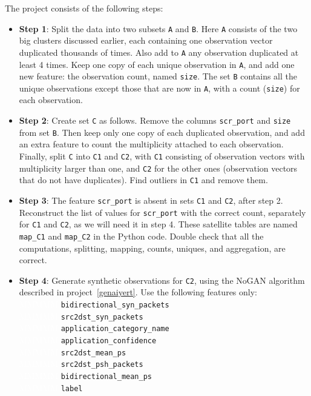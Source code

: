 \documentclass[oneside,10pt]{book}
\begin{document}
\noindent The project consists of the following steps: \vspace{1ex}
\begin{itemize}
\item[] {\bf Step 1}:  Split the data into two subsets \texttt{A} and \texttt{B}. Here \texttt{A} consists of the two big clusters discussed earlier, each containing one
observation vector duplicated thousands of times. Also add to \texttt{A} any observation duplicated at least 4 times. Keep one copy of each unique observation in \texttt{A}, and add one new feature: the observation count, named \texttt{size}. The set \texttt{B} contains all the unique observations except those that are now in \texttt{A}, with a count (\texttt{size}) for each observation.\vspace{1ex}
\item[] {\bf Step 2}:  Create set \texttt{C} as follows. Remove the columns \texttt{scr\_port} and \texttt{size} from set \texttt{B}.
Then keep only one copy of each duplicated observation, and add an extra feature to count the multiplicity attached to each observation.
Finally, split \texttt{C} into \texttt{C1} and \texttt{C2}, with \texttt{C1} consisting of observation vectors with multiplicity larger than one, and \texttt{C2} for the other ones (observation vectors that do not have duplicates). Find outliers in \texttt{C1} and remove them.
\vspace{1ex}
\item[] {\bf Step 3}: The feature \texttt{scr\_port} is absent in sets \texttt{C1} and \texttt{C2}, after step 2.
 Reconstruct the list of values for \texttt{scr\_port} with the correct count, separately for \texttt{C1} and \texttt{C2}, as we will need it in step 4. These
 satellite tables
 are named \texttt{map\_C1} and \texttt{map\_C2} in the Python code. Double check that all the computations, splitting, mapping, counts, uniques, and aggregation, are correct. \vspace{1ex}

\item[] {\bf Step 4}: Generate synthetic observations for \texttt{C2}, using the NoGAN algorithm described in project~\ref{genaiyert}.
Use the following features only: \vspace{1ex}\\
\textcolor{white}{MMMMM} \texttt{bidirectional\_syn\_packets}	\\
\textcolor{white}{MMMMM}  \texttt{src2dst\_syn\_packets}	\\
\textcolor{white}{MMMMM}  \texttt{application\_category\_name}	\\
\textcolor{white}{MMMMM}  \texttt{application\_confidence}\\
\textcolor{white}{MMMMM}  \texttt{src2dst\_mean\_ps}\\
\textcolor{white}{MMMMM}  \texttt{src2dst\_psh\_packets}\\
\textcolor{white}{MMMMM}  \texttt{bidirectional\_mean\_ps}\\
\textcolor{white}{MMMMM}  \texttt{label}\vspace{1ex}


\end{itemize}
\end{document}

